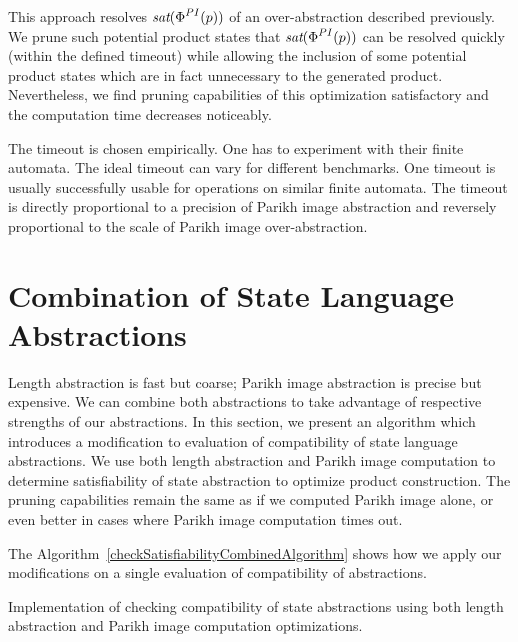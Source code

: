 This approach resolves $\emph{sat}(\emph{$\Phi$}^{PI}(p))$ of an over-abstraction described previously. We prune such potential product states that $\emph{sat}(\emph{$\Phi$}^{PI}(p))$ can be resolved quickly (within the defined timeout) while allowing the inclusion of some potential product states which are in fact unnecessary to the generated product. Nevertheless, we find pruning capabilities of this optimization satisfactory and the computation time decreases noticeably.

The timeout is chosen empirically. One has to experiment with their finite automata. The ideal timeout can vary for different benchmarks. One timeout is usually successfully usable for operations on similar finite automata. The timeout is directly proportional to a precision of Parikh image abstraction and reversely proportional to the scale of Parikh image over-abstraction.


\section{Combination of State Language Abstractions}

Length abstraction is fast but coarse; Parikh image abstraction is precise but expensive. We can combine both abstractions to take advantage of respective strengths of our abstractions. In this section, we present an algorithm which introduces a modification to evaluation of compatibility of state language abstractions. We use both length abstraction and Parikh image computation to determine satisfiability of state abstraction to optimize product construction. The pruning capabilities remain the same as if we computed Parikh image alone, or even better in cases where Parikh image computation times out.

The Algorithm~\ref{checkSatisfiabilityCombinedAlgorithm} shows how we apply our modifications on a single evaluation of compatibility of abstractions.

\begin{algorithm}[ht]
\caption{Implementation of checking compatibility of state abstractions using both length abstraction and Parikh image computation optimizations.}\label{checkSatisfiabilityCombinedAlgorithm}



\DontPrintSemicolon

\end{algorithm}


